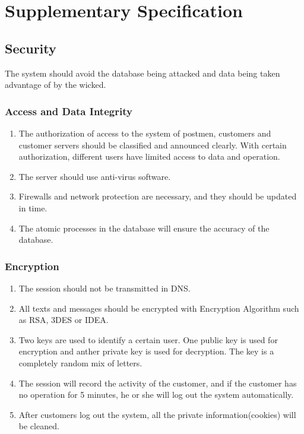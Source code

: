 \documentclass[12pt]{scrreprt}
\begin{document}
\chapter{Supplementary Specification}
\section{Security}
The system should avoid the database being attacked and data being taken
advantage of by the wicked.
\subsection{Access and Data Integrity}
\begin{enumerate}
  \item The authorization of access to the system of postmen, customers
  and customer servers should be classified and announced clearly. With
  certain authorization, different users have limited access to data and
  operation.
  \item The server should use anti-virus software.
  \item Firewalls and network protection are necessary, and they should
  be updated in time.
  \item The atomic processes in the database will ensure the accuracy
  of the database.
\end{enumerate}

\subsection{Encryption}
\begin{enumerate}
  \item The session should not be transmitted in DNS.
  \item All texts and messages should be encrypted with Encryption Algorithm
  such as RSA, 3DES or IDEA.
  \item Two keys are used to identify a certain user. One public key is
  used for encryption and anther private key is used for decryption.
  The key is a completely random mix of letters.
  \item The session will record the activity of the customer, and if the
  customer has no operation for 5 minutes, he or she will log out the system
  automatically.
  \item After customers log out the system, all the private information(cookies)
  will be cleaned.
\end{enumerate}
\end{document}
